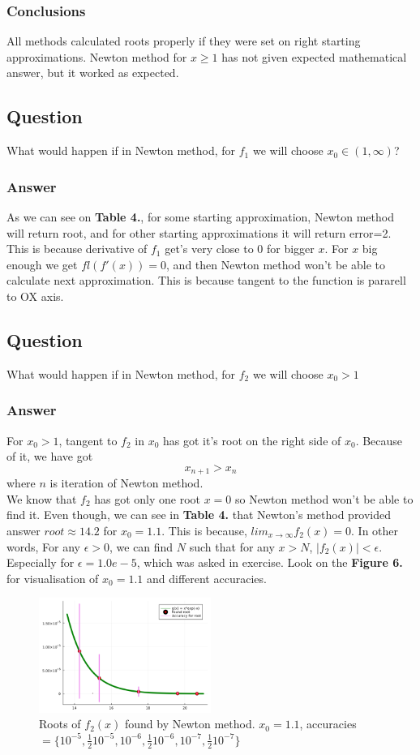 \documentclass[11pt]{article}
\begin{document}
\subsubsection{Conclusions}
All methods calculated roots properly if they were set on right starting approximations. Newton method for $x \geq 1$ has not given expected mathematical answer, but it worked as expected. 
\subsection{Question}
What would happen if in Newton method, for $f_1$ we will choose $x_0 \in (1, \infty)$?
\subsubsection*{Answer}
As we can see on \textbf{Table 4.}, for some starting approximation, Newton method will return root, and for other starting approximations it will return error=2.
This is because derivative of $f_1$ get's very close to 0 for bigger $x$. For $x$ big enough we get $fl(f'(x)) = 0$, and then Newton method won't be able to calculate next approximation. 
This is because tangent to the function is pararell to OX axis.
\subsection{Question}
What would happen if in Newton method, for $f_2$ we will choose $x_0 > 1$
\subsubsection*{Answer}
For $x_0 > 1$, tangent to $f_2$ in $x_0$ has got it's root on the right side of $x_0$. 
Because of it, we have got $$x_{n+1} > x_n$$ where $n$ is iteration of Newton method.\\
We know that $f_2$ has got only one root $x=0$ so Newton method won't be able to find it.
Even though, we can see in \textbf{Table 4.} that Newton's method provided answer $root \approx 14.2$ for $x_0 = 1.1$.
This is because, $lim_{x \rightarrow \infty} f_2(x) = 0$. In other words, For any $\epsilon > 0$, we can find $N$ such that for any $x > N$, $|f_2(x)| < \epsilon$. 
Especially for $\epsilon = 1.0e-5$, which was asked in exercise.
Look on the \textbf{Figure 6.} for visualisation of $x_0 = 1.1$ and different accuracies.

\begin{figure}[h]
    \centering
    \includegraphics[width=0.5\textwidth]{ex6_3.png}
    \caption{Roots of $f_2(x)$ found by Newton method. $x_0 = 1.1$, accuracies $= \{10^{-5}, \frac{1}{2}10^{-5}, 10^{-6}, \frac{1}{2}10^{-6}, 10^{-7}, \frac{1}{2}10^{-7}\}$}
\end{figure}
\end{document}
